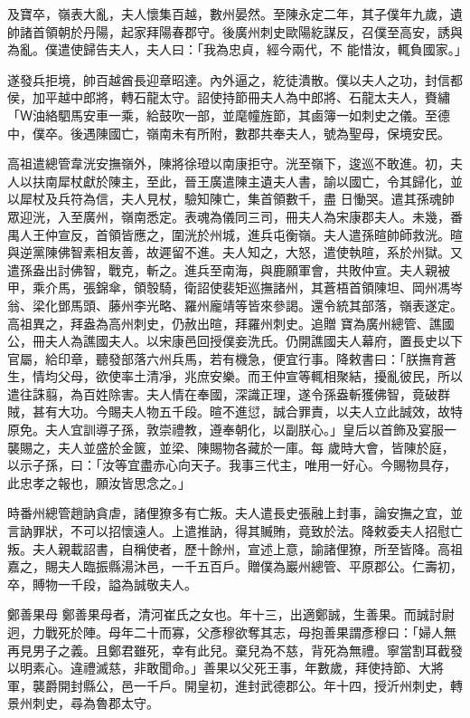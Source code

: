 \begin{pinyinscope}
 及寶卒，嶺表大亂，夫人懷集百越，數州晏然。至陳永定二年，其子僕年九歲，遺帥諸首領朝於丹陽，起家拜陽春郡守。後廣州刺史歐陽紇謀反，召僕至高安，誘與為亂。僕遣使歸告夫人，夫人曰：「我為忠貞，經今兩代，不
 能惜汝，輒負國家。」



 遂發兵拒境，帥百越酋長迎章昭達。內外逼之，紇徒潰散。僕以夫人之功，封信都侯，加平越中郎將，轉石龍太守。詔使持節冊夫人為中郎將、石龍太夫人，賚繡「Ｗ油絡駟馬安車一乘，給鼓吹一部，並麾幢旌節，其鹵簿一如刺史之儀。至德中，僕卒。後遇陳國亡，嶺南未有所附，數郡共奉夫人，號為聖母，保境安民。



 高祖遣總管韋洸安撫嶺外，陳將徐璒以南康拒守。洸至嶺下，逡巡不敢進。初，夫人以扶南犀杖獻於陳主，至此，晉王廣遣陳主遺夫人書，諭以國亡，令其歸化，並以犀杖及兵符為信，夫人見杖，驗知陳亡，集首領數千，盡
 日慟哭。遣其孫魂帥眾迎洸，入至廣州，嶺南悉定。表魂為儀同三司，冊夫人為宋康郡夫人。未幾，番禺人王仲宣反，首領皆應之，圍洸於州城，進兵屯衡嶺。夫人遣孫暄帥師救洸。暄與逆黨陳佛智素相友善，故遲留不進。夫人知之，大怒，遣使執暄，系於州獄。又遣孫盎出討佛智，戰克，斬之。進兵至南海，與鹿願軍會，共敗仲宣。夫人親被甲，乘介馬，張錦傘，領彀騎，衛詔使裴矩巡撫諸州，其蒼梧首領陳坦、岡州馮岑翁、梁化鄧馬頭、藤州李光略、羅州龐靖等皆來參謁。還令統其部落，嶺表遂定。高祖異之，拜盎為高州刺史，仍赦出暄，拜羅州刺史。追贈
 寶為廣州總管、譙國公，冊夫人為譙國夫人。以宋康邑回授僕妾洗氏。仍開譙國夫人幕府，置長史以下官屬，給印章，聽發部落六州兵馬，若有機急，便宜行事。降敕書曰：「朕撫育蒼生，情均父母，欲使率土清凈，兆庶安樂。而王仲宣等輒相聚結，擾亂彼民，所以遣往誅翦，為百姓除害。夫人情在奉國，深識正理，遂令孫盎斬獲佛智，竟破群賊，甚有大功。今賜夫人物五千段。暄不進愆，誠合罪責，以夫人立此誠效，故特原免。夫人宜訓導子孫，敦崇禮教，遵奉朝化，以副朕心。」皇后以首飾及宴服一襲賜之，夫人並盛於金篋，並梁、陳賜物各藏於一庫。每
 歲時大會，皆陳於庭，以示子孫，曰：「汝等宜盡赤心向天子。我事三代主，唯用一好心。今賜物具存，此忠孝之報也，願汝皆思念之。」



 時番州總管趙訥貪虐，諸俚獠多有亡叛。夫人遣長史張融上封事，論安撫之宜，並言訥罪狀，不可以招懷遠人。上遣推訥，得其贓賄，竟致於法。降敕委夫人招慰亡叛。夫人親載詔書，自稱使者，歷十餘州，宣述上意，諭諸俚獠，所至皆降。高祖嘉之，賜夫人臨振縣湯沐邑，一千五百戶。贈僕為巖州總管、平原郡公。仁壽初，卒，賻物一千段，謚為誠敬夫人。



 鄭善果母
 鄭善果母者，清河崔氏之女也。年十三，出適鄭誠，生善果。而誠討尉迥，力戰死於陣。母年二十而寡，父彥穆欲奪其志，母抱善果謂彥穆曰：「婦人無再見男子之義。且鄭君雖死，幸有此兒。棄兒為不慈，背死為無禮。寧當割耳截發以明素心。違禮滅慈，非敢聞命。」善果以父死王事，年數歲，拜使持節、大將軍，襲爵開封縣公，邑一千戶。開皇初，進封武德郡公。年十四，授沂州刺史，轉景州刺史，尋為魯郡太守。




\end{pinyinscope}
